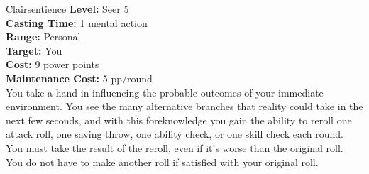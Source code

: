 {Clairsentience}
{
	\textbf{Level:}
	Seer 5\\
	\textbf{Casting Time:}
	1 mental action\\
	\textbf{Range:}
	Personal\\
	\textbf{Target:}
	You\\
	\textbf{Cost:}
	9 power points\\
	\textbf{Maintenance Cost:}
	5 pp/round\\
}
{
	You take a hand in influencing the probable outcomes of your immediate environment. You see the many alternative branches that reality could take in the next few seconds, and with this foreknowledge you gain the ability to reroll one attack roll, one saving throw, one ability check, or one skill check each round. You must take the result of the reroll, even if it’s worse than the original roll. You do not have to make another roll if satisfied with your original roll.
}